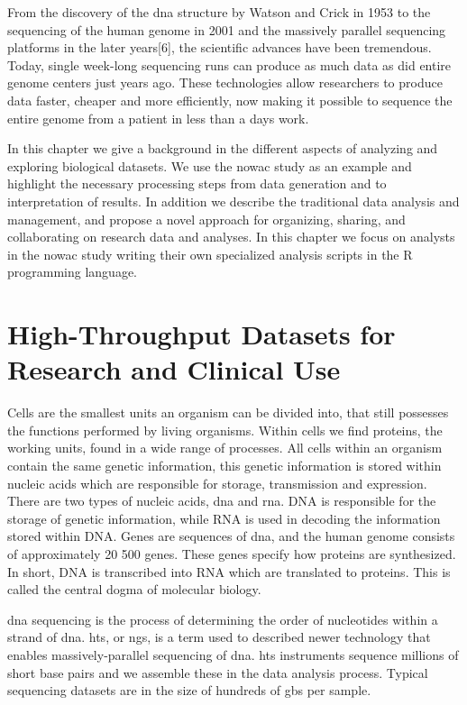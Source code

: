 From the discovery of the \gls{dna} structure by Watson and Crick in
1953\cite{watson1953molecular} to the sequencing of the human genome in 2001
\cite{venter2001sequence,international2001initial} and the massively parallel
sequencing platforms in the later years[6], the scientific advances have been
tremendous. Today, single week-long sequencing runs can produce as much data as
did entire genome centers just years ago.\cite{kahn2011future}  These
technologies allow researchers to produce data faster, cheaper and more
efficiently, now making it possible to sequence the entire genome from a patient in
less than a days work.

In this chapter we give a background in the different aspects of analyzing and
exploring biological datasets. We use the \gls{nowac} study as an example and
highlight the necessary processing steps from data generation and to
interpretation of results. In addition we describe the traditional data analysis
and management, and propose a novel approach for organizing, sharing, and
collaborating on research data and analyses. In this chapter we focus on
analysts in the \gls{nowac} study writing their own specialized analysis scripts
in the R programming language.

\section{High-Throughput Datasets for Research and Clinical Use} 
Cells are the smallest units an organism can be divided into, that still
possesses the functions performed by living organisms. Within cells we find
proteins, the working units, found in a wide range of processes.  All cells
within an organism contain the same genetic information, this genetic
information is stored within nucleic acids which are responsible for storage,
transmission and expression. There are two types of nucleic acids, \gls{dna} and
\gls{rna}.  DNA is responsible for the storage of genetic information, while RNA
is used in decoding the information stored within DNA. Genes are sequences of
\gls{dna}, and the human genome consists of approximately 20 500 genes. These
genes specify how proteins are synthesized. In short, DNA is transcribed into
RNA which are translated to proteins. This is called the central dogma of
molecular biology. 

\gls{dna} sequencing is the process of determining the order of nucleotides
within a strand of \gls{dna}. \gls{hts}, or \gls{ngs}, is a term used to
described newer technology that enables massively-parallel sequencing of
\gls{dna}. \gls{hts} instruments sequence millions of short base pairs and
we assemble these in the data analysis process. Typical sequencing datasets are
in the size of hundreds of \glspl{gb} per sample. 


